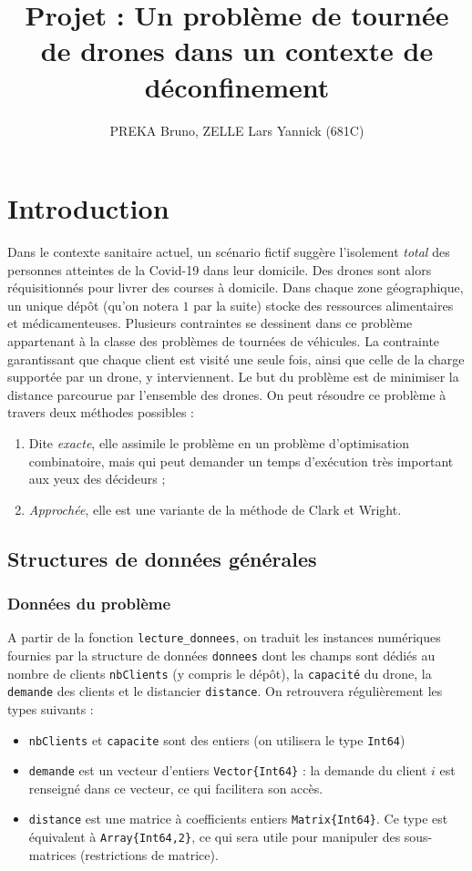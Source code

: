 \documentclass[french, 11pt, a4paper]{article} %
\title{Projet : Un problème de tournée de drones dans un contexte de déconfinement}
\author{PREKA Bruno, ZELLE Lars Yannick (681C)}
\newcommand{\smb}{\smallbreak}
\begin{document}
\maketitle



\section{Introduction}

Dans le contexte sanitaire actuel, un scénario fictif suggère l'isolement \emph{total} des personnes
atteintes de la Covid-19 dans leur domicile. Des drones sont alors réquisitionnés pour livrer des courses
à domicile.
\smb Dans chaque zone géographique, un unique dépôt (qu'on notera $1$ par la suite) stocke des ressources alimentaires et médicamenteuses.
Plusieurs contraintes se dessinent dans ce problème appartenant à la classe des problèmes de tournées de véhicules.
La contrainte garantissant que chaque client est visité une seule fois, ainsi que celle de la charge supportée par un drone,
y interviennent.
Le but du problème est de minimiser la distance parcourue par l'ensemble des drones.
\smb On peut résoudre ce problème à travers deux méthodes possibles :
\vspace{-0.2cm}
\begin{enumerate}
    \item Dite \emph{exacte}, elle assimile le problème en un problème d'optimisation
combinatoire, mais qui peut demander un temps d'exécution très important aux yeux des décideurs ;
    \item \emph{Approchée}, elle est une variante de la méthode de Clark et Wright.
\end{enumerate}

\subsection{Structures de données générales}

\subsubsection{Données du problème}
A partir de la fonction \verb+lecture_donnees+, on traduit les instances numériques fournies
par la structure de données 
\verb+donnees+ dont les champs sont dédiés au nombre de clients \verb+nbClients+ (y compris le dépôt),
la \verb+capacité+ du drone, la \verb+demande+ des clients et le distancier \verb+distance+. On retrouvera régulièrement les types suivants :
\begin{itemize}
    \item \verb+nbClients+ et \verb+capacite+ sont des entiers (on utilisera le type \verb+Int64+)
    \item \verb+demande+ est un vecteur d'entiers \verb+Vector{Int64}+ : la demande du client $i$ est renseigné dans ce vecteur, ce qui facilitera son accès.
    \item \verb+distance+ est une matrice à coefficients entiers \verb+Matrix{Int64}+. Ce type est équivalent à \verb+Array{Int64,2}+, ce qui sera utile pour manipuler des sous-matrices (restrictions de matrice).
\end{itemize}
\end{document}
